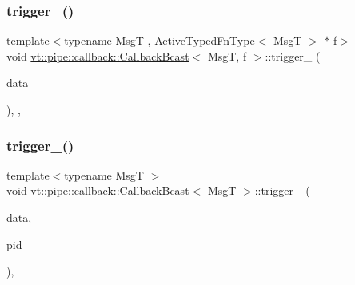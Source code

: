 \subsubsection{\texorpdfstring{trigger\+\_\+()}{trigger\_()}\hspace{0.1cm}{\footnotesize\ttfamily [1/3]}}
{\footnotesize\ttfamily template$<$typename MsgT , Active\+Typed\+Fn\+Type$<$ Msg\+T $>$ $\ast$ f$>$ \\
void \hyperlink{structvt_1_1pipe_1_1callback_1_1_callback_bcast}{vt\+::pipe\+::callback\+::\+Callback\+Bcast}$<$ MsgT, f $>$\+::trigger\+\_\+ (\begin{DoxyParamCaption}\item[{\hyperlink{structvt_1_1pipe_1_1callback_1_1_callback_bcast_aaf994b71056001334d30d74fa9c958f9}{Signal\+Data\+Type} $\ast$}]{data }\end{DoxyParamCaption})\hspace{0.3cm}{\ttfamily [inline]}, {\ttfamily [override]}, {\ttfamily [private]}}

\mbox{\label{structvt_1_1pipe_1_1callback_1_1_callback_bcast_a8c7fea2fd47017f1cd55f249ce5111a0}} 
\subsubsection{\texorpdfstring{trigger\+\_\+()}{trigger\_()}\hspace{0.1cm}{\footnotesize\ttfamily [2/3]}}
{\footnotesize\ttfamily template$<$typename MsgT $>$ \\
void \hyperlink{structvt_1_1pipe_1_1callback_1_1_callback_bcast}{vt\+::pipe\+::callback\+::\+Callback\+Bcast}$<$ MsgT $>$\+::trigger\+\_\+ (\begin{DoxyParamCaption}\item[{\hyperlink{structvt_1_1pipe_1_1callback_1_1_callback_bcast_aaf994b71056001334d30d74fa9c958f9}{Signal\+Data\+Type} $\ast$}]{data,  }\item[{\hyperlink{namespacevt_ac9852acda74d1896f48f406cd72c7bd3}{Pipe\+Type} const \&}]{pid }\end{DoxyParamCaption})\hspace{0.3cm}{\ttfamily [override]}, {\ttfamily [private]}}


